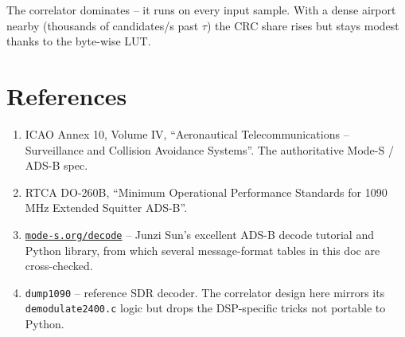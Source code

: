 \documentclass[11pt,a4paper]{article}
\begin{document}
The correlator dominates -- it runs on every input sample.  With a
dense airport nearby (thousands of candidates/s past $\tau$) the CRC
share rises but stays modest thanks to the byte-wise LUT.

\section{References}

\begin{enumerate}
  \item ICAO Annex 10, Volume IV, ``Aeronautical Telecommunications --
        Surveillance and Collision Avoidance Systems''.  The
        authoritative Mode-S / ADS-B spec.
  \item RTCA DO-260B, ``Minimum Operational Performance Standards for
        1090 MHz Extended Squitter ADS-B''.
  \item \href{https://mode-s.org/decode/}{\texttt{mode-s.org/decode}}
        -- Junzi Sun's excellent ADS-B decode tutorial and Python
        library, from which several message-format tables in this doc
        are cross-checked.
  \item \texttt{dump1090} -- reference SDR decoder.  The correlator
        design here mirrors its \texttt{demodulate2400.c} logic but
        drops the DSP-specific tricks not portable to Python.
\end{enumerate}
\end{document}
